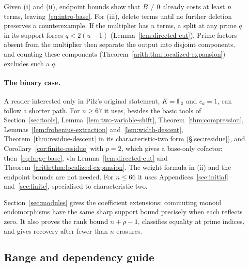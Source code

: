 \documentclass[11pt]{article}
\numberwithin{equation}{section}
\theoremstyle{definition}\newtheorem{definition}[theorem]{Definition}
\theoremstyle{remark}\newtheorem{remark}[theorem]{Remark}
\begin{document}
Given (i) and (ii), endpoint bounds show that $B\ne0$ already costs at
least $n$ terms, leaving~\eqref{eq:intro-base}. For (iii), delete terms
until no further deletion preserves a counterexample. If the multiplier
has $u$ terms, a split at any prime $q$ in its support forces
$q<2(u-1)$ (Lemma~\ref{lem:directed-cut}). Prime factors absent from the
multiplier then separate the output into disjoint components, and
counting these components (Theorem~\ref{arith:thm:localized-expansion})
excludes such a $q$.

\paragraph{The binary case.}
A reader interested only in Pilz's original statement, $K=\mathbb F_2$
and $c_a=1$, can follow a shorter path. For $n\ge67$ it uses, besides the basic tools of
Section~\ref{sec:tools}, Lemma~\ref{lem:two-variable-shift},
Theorem~\ref{thm:compression},
Lemmas~\ref{lem:frobenius-extraction} and~\ref{lem:width-descent},
Theorem~\ref{thm:residue-descent} in its characteristic-two form
(\S\ref{sec:residue}), and Corollary~\ref{cor:finite-residue} with $p=2$, which gives a
base-only cofactor; then~\eqref{eq:large-base}, via
Lemma~\ref{lem:directed-cut} and Theorem~\ref{arith:thm:localized-expansion}.
The weight formula in (ii) and the endpoint bounds are not needed.
For $n\le66$ it uses Appendices~\ref{sec:initial}
and~\ref{sec:finite}, specialised to characteristic two.

Section~\ref{sec:modules} gives the coefficient extensions: commuting
monoid endomorphisms have the same sharp support bound precisely when
each reflects zero. It also proves the rank bound $n+\rho-1$, classifies
equality at prime indices, and gives recovery after fewer than $n$
erasures.

\subsection*{Range and dependency guide}
\end{document}
